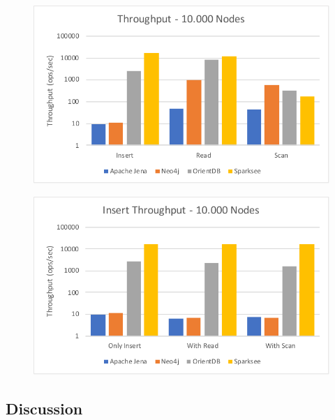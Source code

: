 \begin{figure}[h!]
  \begin{minipage}{.5\textwidth}
    \centering
    \includegraphics[width=\textwidth]{images/responsiveness/operationReadScan}
    \label{fig:operationReadScan}
  \end{minipage}
  \begin{minipage}{.5\textwidth}
    \centering
    \includegraphics[width=\textwidth]{images/responsiveness/insertWithWithoutReadScan}
    \label{fig:insertWithWithoutReadScan}
  \end{minipage}
\end{figure}

\subsection{Discussion}
